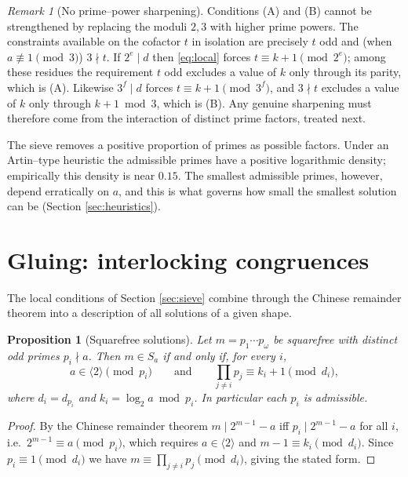 \documentclass[11pt,reqno]{amsart}
\theoremstyle{plain}
\newtheorem{proposition}{Proposition}
\theoremstyle{definition}
\theoremstyle{remark}
\newtheorem{remark}{Remark}
\newcommand{\dvd}{\mid}
\newcommand{\Sa}{S_a}
\begin{document}
\begin{remark}[No prime--power sharpening]\label{rem:nosharpen}
Conditions (A) and (B) cannot be strengthened by replacing the moduli $2,3$ with higher prime powers. The constraints available on the cofactor $t$ in isolation are precisely $t$ odd and (when $a\not\equiv1\pmod3$) $3\nmid t$. If $2^{e}\dvd d$ then \eqref{eq:local} forces $t\equiv k+1\pmod{2^{e}}$; among these residues the requirement $t$ odd excludes a value of $k$ only through its parity, which is (A). Likewise $3^{f}\dvd d$ forces $t\equiv k+1\pmod{3^{f}}$, and $3\nmid t$ excludes a value of $k$ only through $k+1\bmod3$, which is (B). Any genuine sharpening must therefore come from the interaction of distinct prime factors, treated next.
\end{remark}

The sieve removes a positive proportion of primes as possible factors. Under an Artin--type heuristic \cite{hooley} the admissible primes have a positive logarithmic density; empirically this density is near $0.15$. The smallest admissible primes, however, depend erratically on $a$, and this is what governs how small the smallest solution can be (Section \ref{sec:heuristics}).

\section{Gluing: interlocking congruences}\label{sec:gluing}

The local conditions of Section \ref{sec:sieve} combine through the Chinese remainder theorem into a description of all solutions of a given shape.

\begin{proposition}[Squarefree solutions]\label{prop:squarefree}
Let $m=p_1\cdots p_\omega$ be squarefree with distinct odd primes $p_i\nmid a$. Then $m\in\Sa$ if and only if, for every $i$,
\[
a\in\langle2\rangle\pmod{p_i}\qquad\text{and}\qquad \prod_{j\ne i}p_j\equiv k_i+1\pmod{d_i},
\]
where $d_i=d_{p_i}$ and $k_i=\log_2a\bmod p_i$. In particular each $p_i$ is admissible.
\end{proposition}

\begin{proof}
By the Chinese remainder theorem $m\dvd2^{m-1}-a$ iff $p_i\dvd2^{m-1}-a$ for all $i$, i.e.\ $2^{m-1}\equiv a\pmod{p_i}$, which requires $a\in\langle2\rangle$ and $m-1\equiv k_i\pmod{d_i}$. Since $p_i\equiv1\pmod{d_i}$ we have $m\equiv\prod_{j\ne i}p_j\pmod{d_i}$, giving the stated form.
\end{proof}
\end{document}
